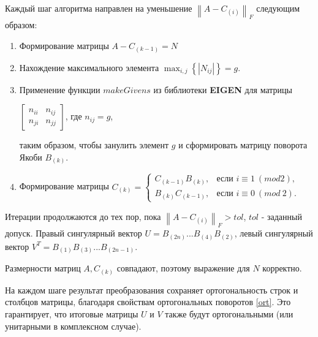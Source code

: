 Каждый шаг алгоритма направлен на уменьшение $\left\|  A-C_{(i)}\right\|_F$ следующим образом:
\begin{enumerate}
    \item Формирование матрицы $A-C_{(k-1)} = N$
    \item Нахождение максимального элемента $\displaystyle\max_{i,j}\left\{ \left| N_{ij} \right| \right\} = g$. 
    \item Применение функции $makeGivens$ из библиотеки \textbf{EIGEN} для матрицы
    \begin{center}
        $\begin{bmatrix}
            n_{ii} & n_{ij}\\
            n_{ji} & n_{jj}
        \end{bmatrix}$, где $n_{ij} = g$,
    \end{center}
    таким образом, чтобы занулить элемент $g$ и сформировать матрицу поворота Якоби $B_{(k)}$.
    \item Формирование матрицы $C_{(k)} = 
    \begin{cases}
    C_{(k - 1)}B_{(k)}, & \text{если } i \equiv 1 \ (mod 2),\\
    B_{(k)}C_{(k - 1)}, & \text{если } i \equiv 0 \ (mod\ 2).
    \end{cases}$
\end{enumerate}
Итерации продолжаются до тех пор, пока $\left\|  A-C_{(i)}\right\|_F >tol$, $tol$ - заданный допуск. Правый сингулярный вектор $U = B_{(2n)}...B_{(4)}B_{(2)}$, левый сингулярный вектор $V^T = B_{(1)}B_{(3)}...B_{(2n-1)}$.

\begin{note}
    Размерности матриц $A, C_{(k)}$ совпадают, поэтому выражение для $N$ корректно.
\end{note}

\begin{note}
    На каждом шаге результат преобразования сохраняет ортогональность строк и столбцов матрицы, благодаря свойствам ортогональных поворотов \eqref{ort}. Это гарантирует, что итоговые матрицы $U$ и $V$ также будут ортогональными (или унитарными в комплексном случае). 
\end{note}

